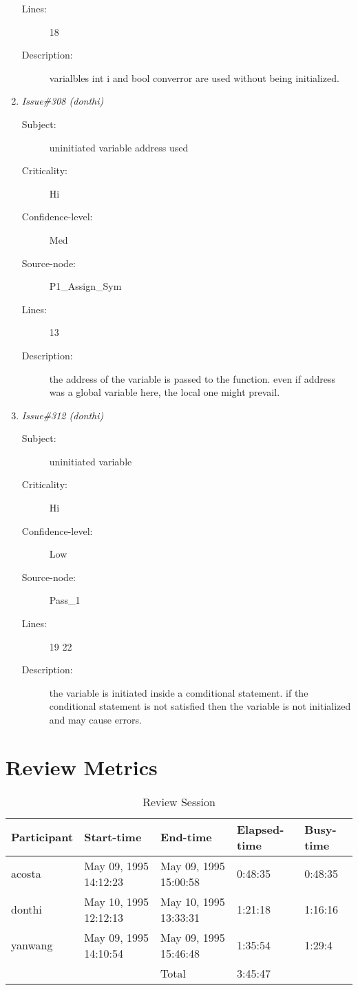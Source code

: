 \begin{enumerate}
\begin{description}
\item [Lines:] 18

\item [Description:] varialbles int i and bool converror are used
without being initialized.
\end{description}
\item {\it Issue\#308 (donthi)}
\begin{description}
\item [Subject:] uninitiated variable address used
\item [Criticality:] Hi
\item [Confidence-level:] Med
\item [Source-node:] P1\_Assign\_Sym

\item [Lines:] 13

\item [Description:] the address of the variable is passed to the
function. even if address was a global variable here, the local one might
prevail.
\end{description}
\item {\it Issue\#312 (donthi)}
\begin{description}
\item [Subject:] uninitiated variable
\item [Criticality:] Hi
\item [Confidence-level:] Low
\item [Source-node:] Pass\_1

\item [Lines:] 19 22

\item [Description:] the variable is initiated inside a comditional
statement.  if the conditional statement is not satisfied then the variable
is not initialized and may cause errors.
\end{description}
\end{enumerate}
\section{Review Metrics}
\begin{table}[hb]
\begin{center}
\begin{tabular}{|l|l|l|l|l|}
\hline
Participant & Start-time & End-time & Elapsed-time & Busy-time \\
\hline
acosta & May 09, 1995 14:12:23 & May 09, 1995 15:00:58 & 0:48:35 & 0:48:35 \\
donthi & May 10, 1995 12:12:13 & May 10, 1995 13:33:31 & 1:21:18 & 1:16:16 \\
yanwang & May 09, 1995 14:10:54 & May 09, 1995 15:46:48 & 1:35:54 & 1:29:4 \\
\hline
 & & Total & 3:45:47 & \\
\hline
\end{tabular}
\end{center}
\caption{Review Session}
\end{table}


